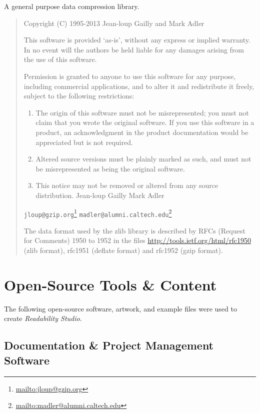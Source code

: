 \documentclass[
]{book}
\DeclareRobustCommand{\href}[2]{#2\footnote{\url{#1}}}
\theoremstyle{definition}
\theoremstyle{definition}
\theoremstyle{definition}
\theoremstyle{definition}
\theoremstyle{remark}
\begin{document}
A general purpose data compression library.

\begin{quote}
Copyright (C) 1995-2013 Jean-loup Gailly and Mark Adler

This software is provided `as-is', without any express or implied
warranty. In no event will the authors be held liable for any damages
arising from the use of this software.

Permission is granted to anyone to use this software for any purpose,
including commercial applications, and to alter it and redistribute it
freely, subject to the following restrictions:

\begin{enumerate}
\def\labelenumi{\arabic{enumi}.}
\item
  The origin of this software must not be misrepresented; you must not
  claim that you wrote the original software. If you use this software
  in a product, an acknowledgment in the product documentation would be
  appreciated but is not required.
\item
  Altered source versions must be plainly marked as such, and must not be
  misrepresented as being the original software.
\item
  This notice may not be removed or altered from any source distribution.
  Jean-loup Gailly Mark Adler
\end{enumerate}

\href{mailto:jloup@gzip.org}{\nolinkurl{jloup@gzip.org}} \href{mailto:madler@alumni.caltech.edu}{\nolinkurl{madler@alumni.caltech.edu}}

The data format used by the zlib library is described by RFCs (Request for
Comments) 1950 to 1952 in the files \url{http://tools.ietf.org/html/rfc1950}
(zlib format), rfc1951 (deflate format) and rfc1952 (gzip format).
\end{quote}

\hypertarget{open-source-tools-content}{%
\section{Open-Source Tools \& Content}\label{open-source-tools-content}}

The following open-source software, artwork, and example files were used to create \emph{Readability Studio}.

\hypertarget{documentation-project-management-software}{%
\subsection*{Documentation \& Project Management Software}\label{documentation-project-management-software}}
\end{document}
